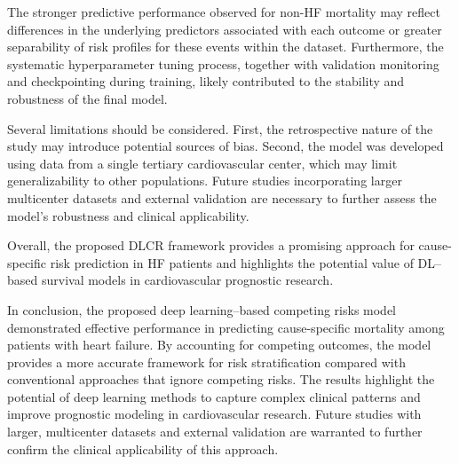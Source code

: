 \documentclass[twoside]{article}
\begin{document}
The stronger predictive performance observed for non-HF mortality may reflect differences in the underlying predictors associated with each outcome or greater separability of risk profiles for these events within the dataset. Furthermore, the systematic hyperparameter tuning process, together with validation monitoring and checkpointing during training, likely contributed to the stability and robustness of the final model.

Several limitations should be considered. First, the retrospective nature of the study may introduce potential sources of bias. Second, the model was developed using data from a single tertiary cardiovascular center, which may limit generalizability to other populations. Future studies incorporating larger multicenter datasets and external validation are necessary to further assess the model's robustness and clinical applicability.

Overall, the proposed DLCR framework provides a promising approach for cause-specific risk prediction in HF patients and highlights the potential value of DL–based survival models in cardiovascular prognostic research.

In conclusion, the proposed deep learning–based competing risks model demonstrated effective performance in predicting cause-specific mortality among patients with heart failure. By accounting for competing outcomes, the model provides a more accurate framework for risk stratification compared with conventional approaches that ignore competing risks. The results highlight the potential of deep learning methods to capture complex clinical patterns and improve prognostic modeling in cardiovascular research. Future studies with larger, multicenter datasets and external validation are warranted to further confirm the clinical applicability of this approach.
\end{document}
